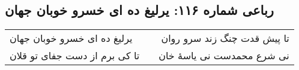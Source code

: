 \begin{center}
\section*{رباعی شماره ۱۱۶: یرلیغ ده ای خسرو خوبان جهان}
\label{sec:116}
\begin{longtable}{l p{0.5cm} r}
یرلیغ ده ای خسرو خوبان جهان
&&
تا پیش قدت چنگ زند سرو روان
\\
تا کی برم از دست جفای تو قلان
&&
نی شرع محمدست نی یاسهٔ خان
\\
\end{longtable}
\end{center}
